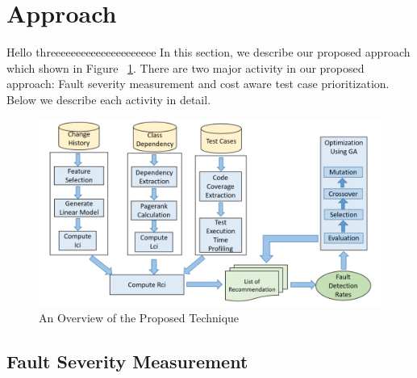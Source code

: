 \section{Approach}
\label{sec:method}

Hello threeeeeeeeeeeeeeeeeeeee
In this section, we describe our proposed approach which shown in 
Figure ~\ref{fig:workflow}.
There are two major activity in our proposed approach: 
Fault severity measurement and cost aware test case prioritization. 
Below we describe each activity in detail. 

\begin{figure}[!hb]
	\centering
	\includegraphics[width=0.75\linewidth]{./workflow4.png}
	\vspace*{3pt}
	\caption{An Overview of the Proposed Technique}
	\label{fig:workflow}
\end{figure} 

\subsection{Fault Severity Measurement}




